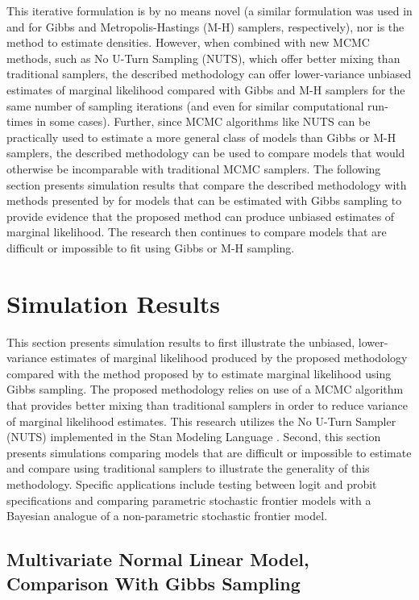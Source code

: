 \documentclass[twocolumn]{article}
\begin{document}
This iterative formulation is by no means novel (a similar formulation was used in \cite{Chib} and \cite{ChibJeliazkov} for Gibbs and Metropolis-Hastings (M-H) samplers, respectively), nor is the method to estimate densities. However, when combined with new MCMC methods, such as No U-Turn Sampling (NUTS), which offer better mixing than  traditional samplers, the described methodology can offer lower-variance unbiased estimates of marginal likelihood compared with Gibbs and M-H samplers for the same number of sampling iterations (and even for similar computational run-times in some cases). Further, since MCMC algorithms like NUTS can be practically used to estimate a more general class of models than Gibbs or M-H samplers, the described methodology can be used to compare models that would otherwise be incomparable with traditional MCMC samplers. The following section presents simulation results that compare the described methodology with methods presented by \cite{Chib} for models that can be estimated with Gibbs sampling to provide evidence that the proposed method can produce unbiased estimates of marginal likelihood. The research then continues to compare models that are difficult or impossible to fit using Gibbs or M-H sampling.

\section{Simulation Results}

This section presents simulation results to first illustrate the unbiased, lower-variance estimates of marginal likelihood produced by the proposed methodology compared with the method proposed by \cite{Chib} to estimate marginal likelihood using Gibbs sampling. The proposed methodology relies on use of a MCMC algorithm that provides better mixing than traditional samplers in order to reduce variance of marginal likelihood estimates. This research utilizes the No U-Turn Sampler (NUTS) implemented in the Stan Modeling Language \citep{rstan}. Second, this section presents simulations comparing models that are difficult or impossible to estimate and compare using traditional samplers to illustrate the generality of this methodology. Specific applications include testing between logit and probit specifications and comparing parametric stochastic frontier models with a Bayesian analogue of a non-parametric stochastic frontier model.

\subsection{Multivariate Normal Linear Model, Comparison With Gibbs Sampling}
\end{document}
